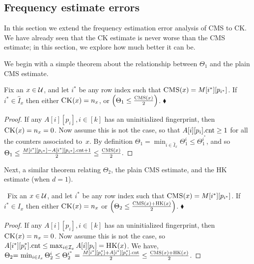 \subsection{Frequency estimate errors} 
In this section we extend the frequency estimation error analysis of CMS to CK.  We have already seen that the CK estimate is never worse than the CMS estimate; in this section, we explore how much better it can be.

We begin with a simple theorem about the relationship between $\Theta_1$ and the plain CMS estimate.
\begin{theorem}\label{thm:cmsmin-noIx:Theta1-cms-relation}
	Fix an $x\in\mathcal{U}$, and let $i^{*}$ be any row index such that $\textnormal{\textsc{CMS}}(x) = M[i^*][p_{i^*}]$. 
	If $i^{*} \in \hat{I}_x$ then either $\textnormal{\textsc{CK}}(x)=n_x$, or $\left(\Theta_1 \leq \frac{\textnormal{\textsc{CMS}}(x)}{2}\right)$. \hfill$\blacklozenge$
\end{theorem}
\begin{proof}If any $A[i][p_{i}], i \in [k]$ has an uninitialized fingerprint, then $\textnormal{\textsc{CK}}(x)=n_x=0$.  Now assume this is not the case, so that $A[i][p_i].\textup{cnt} \geq 1$ for all the counters associated to~$x$.  By definition $\Theta_1 = \min_{i \in \hat{I}_x} \Theta_1^i \leq \Theta_1^{i^{*}}$, and so
	$
	\Theta_1 \leq \frac{M[i^{*}][p_{i^{*}}]-A[i^{*}][p_{i^{*}}].\textup{cnt} + 1}{2} \leq \frac{\textnormal{\textsc{CMS}}(x)}{2}
	$.
\end{proof}

\noindent 
Next, a similar theorem relating $\Theta_2$, the plain CMS estimate, and the HK estimate (when $d=1$).
\begin{theorem}\label{thm:cmsmin-Ix:Theta2-cms-relation}
	~Fix an $x \in \mathcal{U}$, and let $i^{*}$ be any row index such that $\textnormal{\textsc{CMS}}(x) = M[i^*][p_{i^*}]$. If $i^{*} \in I_x$ then either $\textnormal{\textsc{CK}}(x)=n_x$ or $\left(\Theta_2 \leq \frac{\textnormal{\textsc{CMS}}(x) + \textnormal{\textsc{HK}}(x)}{2}\right)$. \hfill$\blacklozenge$
\end{theorem}
\begin{proof} 
	If any $A[i][p_{i}], i {\in} [k]$ has an uninitialized fingerprint, then $\textnormal{\textsc{CK}}(x)=n_x=0$.
	Now assume this is not the case, so $A[i^{*}][p_i^{*}].\textup{cnt} \leq \max_{i \in \mathcal{I}_x}A[i][p_{i}]=\textnormal{\textsc{HK}}(x)$.
	We have, $\Theta_2 { =}\, \min_{i \in I_x} \Theta_2^i \leq \Theta_2^{i^{*}} = \frac{M[i^{*}][p_i^{*}]+A[i^{*}][p_i^{*}].\textup{cnt}}{2} \leq \frac{\textnormal{\textsc{CMS}}(x) + \textnormal{\textsc{HK}}(x)}{2}$.
\end{proof}

